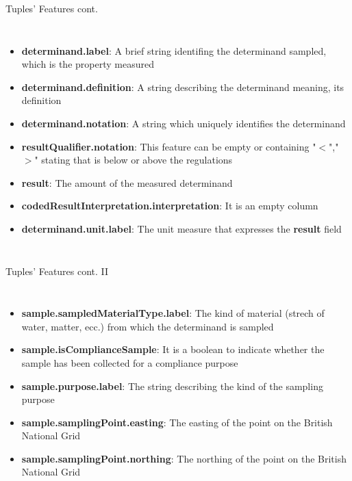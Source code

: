 \documentclass[british]{beamer}
\begin{document}
\begin{frame}{Tuples' Features cont.}
	\begin{columns}
		\begin{itemize}
		\item \textbf{determinand.label}: A brief string identifing the determinand sampled, which is the property measured
		\item \textbf{determinand.definition}: A string describing the determinand meaning, its definition
		\item \textbf{determinand.notation}: A string which uniquely identifies the determinand
		\item \textbf{resultQualifier.notation}: This feature can be empty or containing "$<$","$>$" stating that is below or above the regulations
		\item \textbf{result}: The amount of the measured determinand
		\item \textbf{codedResultInterpretation.interpretation}: It is an empty column
		\item \textbf{determinand.unit.label}: The unit measure that expresses the \textbf{result} field
		\end{itemize}
	\end{columns}
\end{frame}

\begin{frame}{Tuples' Features cont. II}
	\begin{columns}
		\column{0.8\textwidth}
		\begin{itemize}
			\item \textbf{sample.sampledMaterialType.label}: The kind of material (strech of water, matter, ecc.) from which the determinand is sampled
			\item \textbf{sample.isComplianceSample}: It is a boolean to indicate whether the sample has been collected for a compliance purpose
			\item \textbf{sample.purpose.label}: The string describing the kind of the sampling purpose
			\item \textbf{sample.samplingPoint.easting}: The easting of the point on the British National Grid
			\item \textbf{sample.samplingPoint.northing}: The northing of the point on the British National Grid 
		\end{itemize}
	\end{columns}
\end{frame}
\end{document}
